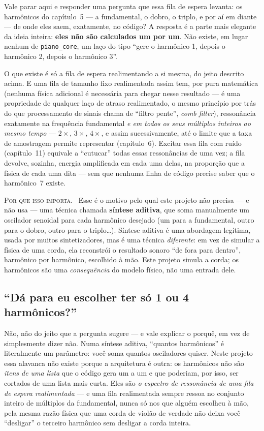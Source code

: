 \documentclass[11pt,oneside]{book}
\newcommand{\nova}[1]{\textsc{\color{accent}#1.}~}
\begin{document}
Vale parar aqui e responder uma pergunta que essa fila de espera levanta:
os harmônicos do capítulo~5 --- a fundamental, o dobro, o triplo, e por aí
em diante --- de onde eles saem, exatamente, no código? A resposta é a
parte mais elegante da ideia inteira: \textbf{eles não são calculados um
por um}. Não existe, em lugar nenhum de \texttt{piano\_core}, um laço do
tipo \enquote{gere o harmônico 1, depois o harmônico 2, depois o harmônico
3}.

O que existe é só a fila de espera realimentando a si mesma, do jeito
descrito acima. E uma fila de tamanho fixo realimentada assim tem, por
pura matemática (nenhuma física adicional é necessária para chegar nesse
resultado --- é uma propriedade de qualquer laço de atraso realimentado, o
mesmo princípio por trás do que processamento de sinais chama de
\enquote{filtro pente}, \emph{comb filter}), ressonância exatamente na
frequência fundamental \emph{e em todos os seus múltiplos inteiros ao
mesmo tempo} --- $2\times$, $3\times$, $4\times$, e assim sucessivamente,
até o limite que a taxa de amostragem permite representar (capítulo~6).
Excitar essa fila com ruído (capítulo~11) equivale a \enquote{cutucar}
todas essas ressonâncias de uma vez; a fila devolve, sozinha, energia
amplificada em cada uma delas, na proporção que a física de cada uma dita
--- sem que nenhuma linha de código precise saber que o harmônico~7
existe.

\begin{newword}
\nova{Por que isso importa} Esse é o motivo pelo qual este projeto não
precisa --- e não usa --- uma técnica chamada \textbf{síntese aditiva},
que soma manualmente um oscilador senoidal para cada harmônico desejado
(um para a fundamental, outro para o dobro, outro para o triplo\ldots).
Síntese aditiva é uma abordagem legítima, usada por muitos sintetizadores,
mas é uma técnica \emph{diferente}: em vez de simular a física de uma
corda, ela reconstrói o resultado sonoro \enquote{de fora para dentro},
harmônico por harmônico, escolhido à mão. Este projeto simula a corda; os
harmônicos são uma \emph{consequência} do modelo físico, não uma entrada
dele.
\end{newword}

\subsection*{\enquote{Dá para eu escolher ter só 1 ou 4 harmônicos?}}

Não, não do jeito que a pergunta sugere --- e vale explicar o porquê, em
vez de simplesmente dizer não. Numa síntese aditiva, \enquote{quantos
harmônicos} é literalmente um parâmetro: você soma quantos osciladores
quiser. Neste projeto essa alavanca não existe porque a arquitetura é
outra: os harmônicos não são \emph{itens de uma lista} que o código gera
um a um e que poderiam, por isso, ser cortados de uma lista mais curta.
Eles são \emph{o espectro de ressonância de uma fila de espera
realimentada} --- e uma fila realimentada sempre ressoa no conjunto
inteiro de múltiplos da fundamental, nunca só nos que alguém escolheu à
mão, pela mesma razão física que uma corda de violão de verdade não deixa
você \enquote{desligar} o terceiro harmônico sem desligar a corda inteira.
\end{document}
